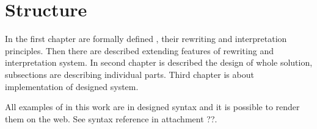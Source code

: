 \section*{Structure}

In the first chapter are formally defined \lsystems, their rewriting and interpretation principles.
Then there are described extending features of \lsystem rewriting and interpretation system.
In second chapter is described the design of whole solution, subsections are describing individual parts.
Third chapter is about implementation of designed system.

All examples of \lsystems in this work are in designed syntax and it is possible to render them on the web.
See syntax reference in attachment ??.































